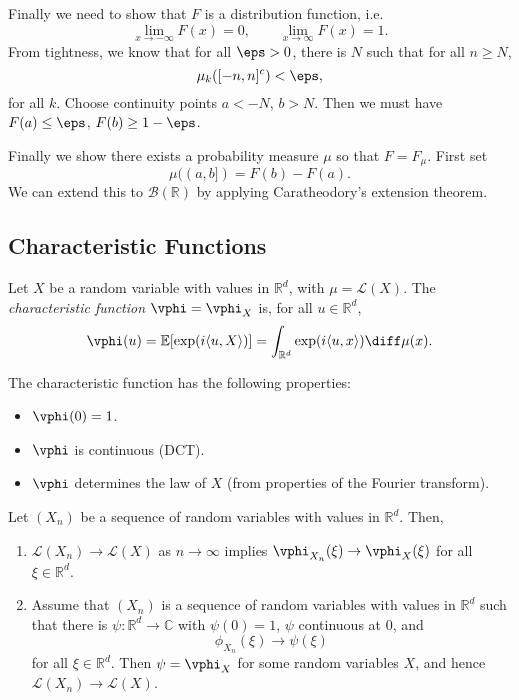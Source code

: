 \documentclass[12pt]{article}
\begin{document}
\begin{proofbox}
	Finally we need to show that $F$ is a distribution function, i.e.
	\[
	\lim_{x \to -\infty} F(x) = 0, \qquad \lim_{x \to \infty} F(x)= 1.
	\]
	From tightness, we know that for all $\eps > 0$, there is $N$ such that for all $n \geq N$,
	\[
		\mu_k([-n, n]^{c}) < \eps,
	\]
	for all $k$. Choose continuity points $a < -N$, $b > N$. Then we must have $F(a) \leq \eps$, $F(b) \geq 1 - \eps$.

	Finally we show there exists a probability measure $\mu$ so that $F = F_\mu$. First set
	\[
		\mu((a, b]) = F(b) - F(a).
	\]
	We can extend this to $\mathcal{B}(\mathbb{R})$ by applying Caratheodory's extension theorem.
\end{proofbox}

\subsection{Characteristic Functions}%
\label{sub:cf}

\begin{definition}
	Let $X$ be a random variable with values in $\mathbb{R}^d$, with $\mu = \mathcal{L}(X)$. The \emph{characteristic function} $\vphi = \vphi_X$ is, for all $u \in \mathbb{R}^d$,
	\[
	\vphi(u) = \mathbb{E}[\exp(i \langle u, X \rangle)] = \int_{\mathbb{R}^d} \exp(i \langle u, x \rangle) \diff \mu (x).
	\]
\end{definition}

The characteristic function has the following properties:
\begin{itemize}
	\item $\vphi(0) = 1$.
	\item $\vphi$ is continuous (DCT).
	\item $\vphi$ determines the law of $X$ (from properties of the Fourier transform).
\end{itemize}

\begin{theorem}[Levy]
	Let $(X_n)$ be a sequence of random variables with values in $\mathbb{R}^d$. Then,
	\begin{enumerate}[\normalfont(i)]
		\item $\mathcal{L}(X_n) \to \mathcal{L}(X)$ as $n \to \infty$ implies $\vphi_{X_n}(\xi) \to \vphi_X(\xi)$ for all $\xi \in \mathbb{R}^d$.
		\item Assume that $(X_n)$ is a sequence of random variables with values in $\mathbb{R}^d$ such that there is $\psi : \mathbb{R}^d \to \mathbb{C}$ with $\psi(0) = 1$, $\psi$ continuous at $0$, and
			\[
			\phi_{X_n}(\xi) \to \psi(\xi)
			\]
			 for all $\xi \in \mathbb{R}^d$. Then $\psi = \vphi_X$ for some random variables $X$, and hence $\mathcal{L}(X_n) \to \mathcal{L}(X)$.
	\end{enumerate}
\end{theorem}
\end{document}
